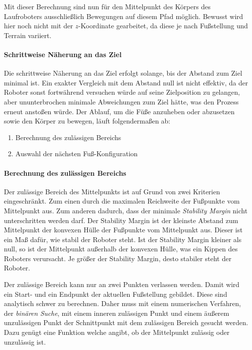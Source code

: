 Mit dieser Berechnung sind nun für den Mittelpunkt des Körpers des Laufroboters ausschließlich Bewegungen auf diesem Pfad möglich. Bewusst wird hier noch nicht mit der $z$-Koordinate gearbeitet, da diese je nach Fußstellung und Terrain variiert.

\paragraph{Schrittweise Näherung an das Ziel}

Die schrittweise Näherung an das Ziel erfolgt solange, bis der Abstand zum Ziel minimal ist. Ein exakter Vergleich mit dem Abstand null ist nicht effektiv, da der Roboter sonst fortwährend versuchen würde auf seine Zielposition zu gelangen, aber ununterbrochen minimale Abweichungen zum Ziel hätte, was den Prozess erneut anstoßen würde. Der Ablauf, um die Füße anzuheben oder abzusetzen sowie den Körper zu bewegen, läuft folgendermaßen ab:
\begin{enumerate}
  \item Berechnung des zulässigen Bereichs
  \item Auswahl der nächsten Fuß-Konfiguration
\end{enumerate}

\paragraph{Berechnung des zulässigen Bereichs}

Der zulässige Bereich des Mittelpunkts ist auf Grund von zwei Kriterien eingeschränkt. Zum einen durch die maximalen Reichweite der Fußpunkte vom Mittelpunkt aus. Zum anderen dadurch, dass der minimale \emph{Stability Margin} nicht unterschritten werden darf. Der Stability Margin ist der kleinste Abstand zum Mittelpunkt der konvexen Hülle der Fußpunkte vom Mittelpunkt aus. Dieser ist ein Maß dafür, wie stabil der Roboter steht. Ist der Stability Margin kleiner als null, so ist der Mittelpunkt außerhalb der konvexen Hülle, was ein Kippen des Roboters verursacht. Je größer der Stability Margin, desto stabiler steht der Roboter.

Der zulässige Bereich kann nur an zwei Punkten verlassen werden. Damit wird ein Start- und ein Endpunkt der aktuellen Fußstellung gebildet. Diese sind analytisch schwer zu berechnen. Daher muss mit einem numerischen Verfahren, der \emph{binären Suche}, mit einem inneren zulässigen Punkt und einem äußerem unzulässigen Punkt der Schnittpunkt mit dem zulässigen Bereich gesucht werden. Dazu genügt eine Funktion welche angibt, ob der Mittelpunkt zulässig oder unzulässig ist.

